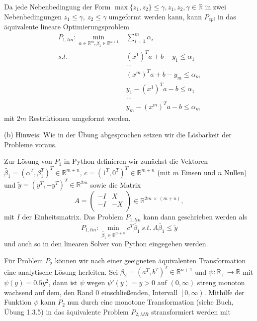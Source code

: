 \documentclass[ngerman, a4paper,12pt]{article}
\begin{document}
Da jede Nebenbedingung der Form $\max\{z_1, z_2\} \leq \gamma, z_1, z_2, \gamma \in \mathbb{R}$ in zwei Nebenbedingungen $z_1 \leq \gamma, \ z_2 \leq \gamma$ umgeformt werden kann, kann $P_{epi}$ in das äquivalente lineare Optimierungsproblem 
\begin{equation*}
	\begin{split}
	P_{1, lin}: \min_{\alpha \in \mathbb{R}^m, \beta_1 \in \mathbb{R}^{n+1}} & \sum_{i=1}^{m} \alpha_i \\
	s.t. \ &(x^1)^Ta + b -y_1 \leq \alpha_1 \\
	& ... \\
	& (x^m)^Ta + b -y_m \leq \alpha_m \\
	& y_1 - (x^1)^Ta - b \leq \alpha_1 \\
	& ... \\
	& y_m - (x^m)^Ta - b \leq \alpha_m 
	\end{split}
\end{equation*}
mit $2m$ Restriktionen umgeformt werden. \par
(b) Hinweis: Wie in der Übung abgesprochen setzen wir die Lösbarkeit der Probleme voraus.\par Zur Lösung von $P_1$ in Python definieren wir zunächst die Vektoren $\tilde{\beta_1} = (\alpha^T, \beta_1^T)^T \in \mathbb{R}^{m+n}$, $c = (1^T, 0^T)^T \in \mathbb{R}^{m+n}$ (mit $m$ Einsen und $n$ Nullen) und $\tilde{y}= (y^T, -y^T)^T \in \mathbb{R}^{2m}$ sowie die Matrix
\begin{equation*}
	A = \begin{pmatrix}
					-I &X \\
					-I & -X \\
					\end{pmatrix} \in \mathbb{R}^{2m \ \times \ (m+n)},
\end{equation*}
mit $I$ der Einheitsmatrix. Das Problem $P_{1, lin}$ kann dann geschrieben werden als
\begin{equation*}
	P_{1, lin}: \min_{\tilde{\beta_1} \in \mathbb{R}^{m+n} } c^T \tilde{\beta_1} \ s.t. \ A \tilde{\beta_1} \leq \tilde{y}
\end{equation*}
und auch so in den linearen Solver von Python eingegeben werden. \par
Für Problem $P_2$ können wir nach einer geeigneten äquivalenten Transformation eine analytische Lösung herleiten. Sei $\beta_2 = (a^T, b^T)^T \in \mathbb{R}^{n+1}$ und $\psi: \mathbb{R}_+ \rightarrow \mathbb{R}$ mit $\psi(y)=0.5y^2$, dann ist $\psi$ wegen $\psi'(y)=y > 0$ auf $(0, \infty)$ streng monoton wachsend auf dem, den Rand $0$ einschließenden, Intervall $\left[0, \infty \right)$. Mithilfe der Funktion $\psi$ kann $P_2$ nun durch eine monotone Transformation (siehe Buch, Übung 1.3.5) in das äquivalente Problem $P_{2, MR}$ stransformiert werden mit
\end{document}
